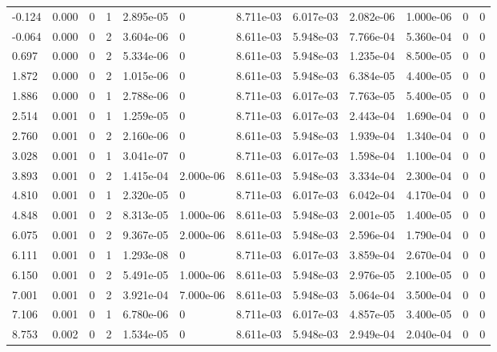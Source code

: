 \documentclass[preview]{standalone}
\begin{document}
{{\begin{tabular}{L{1.2cm}C{1.2cm} C{0.3cm}C{0.5cm} C{1.4cm}C{1.4cm} C{1.4cm}C{1.4cm} C{1.6cm}C{1.6cm} C{1.6cm}C{1.6cm}}
  -0.124  &  0.000  & 0     &  1 &  2.895e-05  & 0  &  8.711e-03&   6.017e-03& 2.082e-06 & 1.000e-06   &  0 & 0  \\ 
  -0.064  &  0.000  & 0     &  2 &  3.604e-06  & 0  &  8.611e-03&   5.948e-03& 7.766e-04 & 5.360e-04   &  0 & 0  \\ 
  0.697  &  0.000  & 0     &  2 &  5.334e-06  & 0  &  8.611e-03&   5.948e-03& 1.235e-04 & 8.500e-05   &  0 & 0  \\ 
  1.872  &  0.000  & 0     &  2 &  1.015e-06  & 0  &  8.611e-03&   5.948e-03& 6.384e-05 & 4.400e-05   &  0 & 0  \\ 
  1.886  &  0.000  & 0     &  1 &  2.788e-06  & 0  &  8.711e-03&   6.017e-03& 7.763e-05 & 5.400e-05   &  0 & 0  \\ 
  2.514  &  0.001  & 0     &  1 &  1.259e-05  & 0  &  8.711e-03&   6.017e-03& 2.443e-04 & 1.690e-04   &  0 & 0  \\ 
  2.760  &  0.001  & 0     &  2 &  2.160e-06  & 0  &  8.611e-03&   5.948e-03& 1.939e-04 & 1.340e-04   &  0 & 0  \\ 
  3.028  &  0.001  & 0     &  1 &  3.041e-07  & 0  &  8.711e-03&   6.017e-03& 1.598e-04 & 1.100e-04   &  0 & 0  \\ 
  3.893  &  0.001  & 0     &  2 &  1.415e-04  & 2.000e-06  &  8.611e-03&   5.948e-03& 3.334e-04 & 2.300e-04   &  0 & 0  \\ 
  4.810  &  0.001  & 0     &  1 &  2.320e-05  & 0  &  8.711e-03&   6.017e-03& 6.042e-04 & 4.170e-04   &  0 & 0  \\ 
  4.848  &  0.001  & 0     &  2 &  8.313e-05  & 1.000e-06  &  8.611e-03&   5.948e-03& 2.001e-05 & 1.400e-05   &  0 & 0  \\ 
  6.075  &  0.001  & 0     &  2 &  9.367e-05  & 2.000e-06  &  8.611e-03&   5.948e-03& 2.596e-04 & 1.790e-04   &  0 & 0  \\ 
  6.111  &  0.001  & 0     &  1 &  1.293e-08  & 0  &  8.711e-03&   6.017e-03& 3.859e-04 & 2.670e-04   &  0 & 0  \\ 
  6.150  &  0.001  & 0     &  2 &  5.491e-05  & 1.000e-06  &  8.611e-03&   5.948e-03& 2.976e-05 & 2.100e-05   &  0 & 0  \\ 
  7.001  &  0.001  & 0     &  2 &  3.921e-04  & 7.000e-06  &  8.611e-03&   5.948e-03& 5.064e-04 & 3.500e-04   &  0 & 0  \\ 
  7.106  &  0.001  & 0     &  1 &  6.780e-06  & 0  &  8.711e-03&   6.017e-03& 4.857e-05 & 3.400e-05   &  0 & 0  \\ 
  8.753  &  0.002  & 0     &  2 &  1.534e-05  & 0  &  8.611e-03&   5.948e-03& 2.949e-04 & 2.040e-04   &  0 & 0  \\ 

\end{tabular}}}
\end{document}
